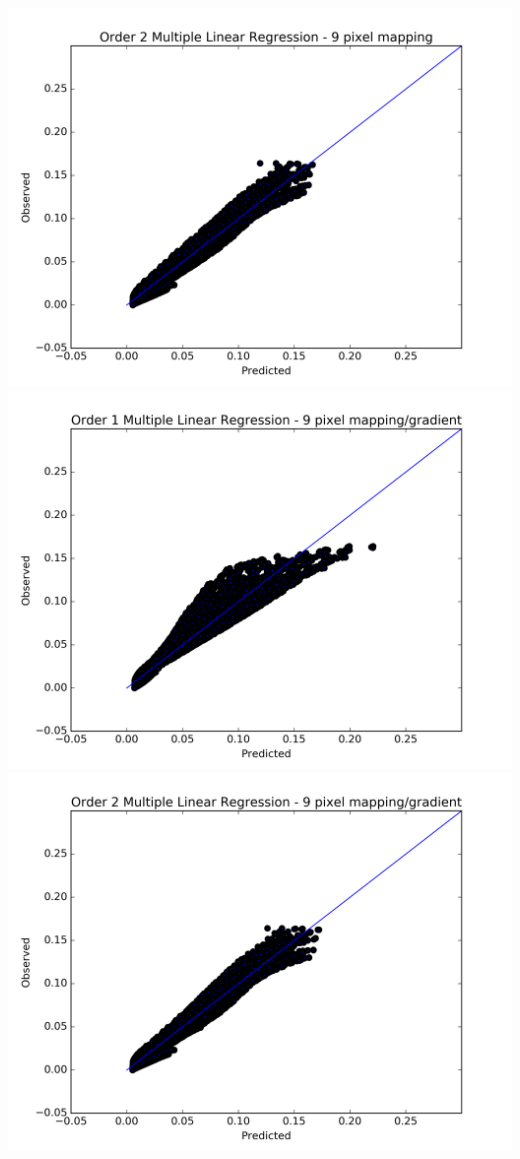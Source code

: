 \documentclass[11pt]{article}
\begin{document}
\includegraphics[width=.9\linewidth]{./images/olr_order2_9pixel.png}\\
\includegraphics[width=.9\linewidth]{./images/olr_order1_9pixel_grad.png}\\
\includegraphics[width=.9\linewidth]{./images/olr_order2_9pixel_grad.png}\\
\end{document}
